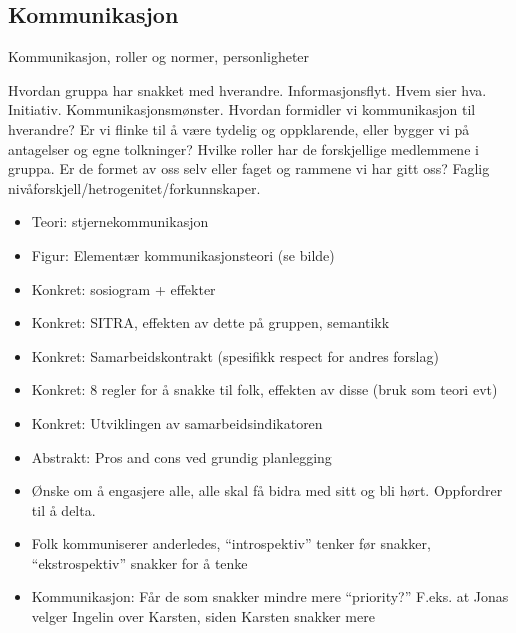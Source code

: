 \subsection{Kommunikasjon}
Kommunikasjon, roller og normer, personligheter

Hvordan gruppa har snakket med hverandre.
Informasjonsflyt.
Hvem sier hva.
Initiativ.
Kommunikasjonsmønster.
Hvordan formidler vi kommunikasjon til hverandre?
Er vi flinke til å være tydelig og oppklarende, eller bygger vi på antagelser og egne tolkninger?
Hvilke roller har de forskjellige medlemmene i gruppa.
Er de formet av oss selv eller faget og rammene vi har gitt oss?
Faglig nivåforskjell/hetrogenitet/forkunnskaper.

\begin{itemize}
\item Teori: stjernekommunikasjon
\item Figur: Elementær kommunikasjonsteori (se bilde)
\item Konkret: sosiogram + effekter
\item Konkret: SITRA, effekten av dette på gruppen, semantikk
\item Konkret: Samarbeidskontrakt (spesifikk respect for andres forslag)
\item Konkret: 8 regler for å snakke til folk, effekten av disse (bruk som teori evt)
\item Konkret: Utviklingen av samarbeidsindikatoren
\item Abstrakt: Pros and cons ved grundig planlegging
\item Ønske om å engasjere alle, alle skal få bidra med sitt og bli hørt. Oppfordrer til å delta.
\item Folk kommuniserer anderledes, “introspektiv” tenker før snakker, “ekstrospektiv” snakker for å tenke
\item Kommunikasjon: Får de som snakker mindre mere “priority?” F.eks. at Jonas velger Ingelin over Karsten, siden Karsten snakker mere
\end{itemize}